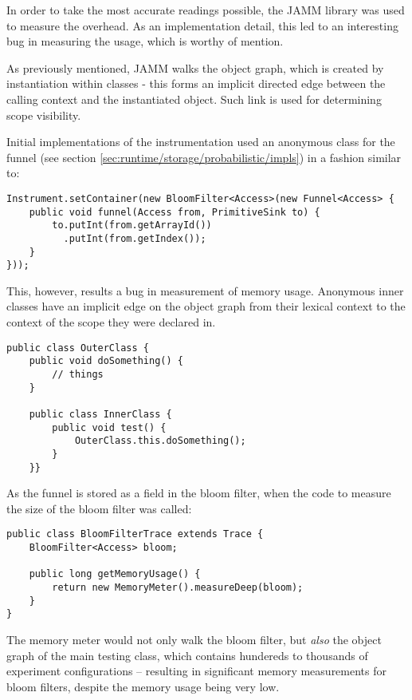 	In order to take the most accurate readings possible, the JAMM library was used to measure the overhead. As an implementation detail, this led to an interesting bug in measuring the usage, which is worthy of mention.
	
	As previously mentioned, JAMM walks the object graph, which is created by instantiation within classes - this forms an implicit directed edge between the calling context and the instantiated object. Such link is used for determining scope visibility.
	
	Initial implementations of the instrumentation used an anonymous class for the funnel (see section \ref{sec:runtime/storage/probabilistic/impls}) in a fashion similar to:
	
	\begin{lstlisting}
Instrument.setContainer(new BloomFilter<Access>(new Funnel<Access> {
    public void funnel(Access from, PrimitiveSink to) {
        to.putInt(from.getArrayId())
          .putInt(from.getIndex());
    }
}));\end{lstlisting}
	
	This, however, results a bug in measurement of memory usage. Anonymous inner classes have an implicit edge on the object graph from their lexical context to the context of the scope they were declared in.
	
	\begin{lstlisting}
public class OuterClass {
    public void doSomething() {
        // things
    }
	
    public class InnerClass {
        public void test() {
            OuterClass.this.doSomething();
        }
    }}\end{lstlisting}
	
	As the funnel is stored as a field in the bloom filter, when the code to measure the size of the bloom filter was called:
	
	\begin{lstlisting}
public class BloomFilterTrace extends Trace {
    BloomFilter<Access> bloom;
    
    public long getMemoryUsage() {
        return new MemoryMeter().measureDeep(bloom);
    }
}\end{lstlisting}

	The memory meter would not only walk the bloom filter, but \emph{also} the object graph of the main testing class, which contains hundereds to thousands of experiment configurations -- resulting in significant memory measurements for bloom filters, despite the memory usage being very low.
	
